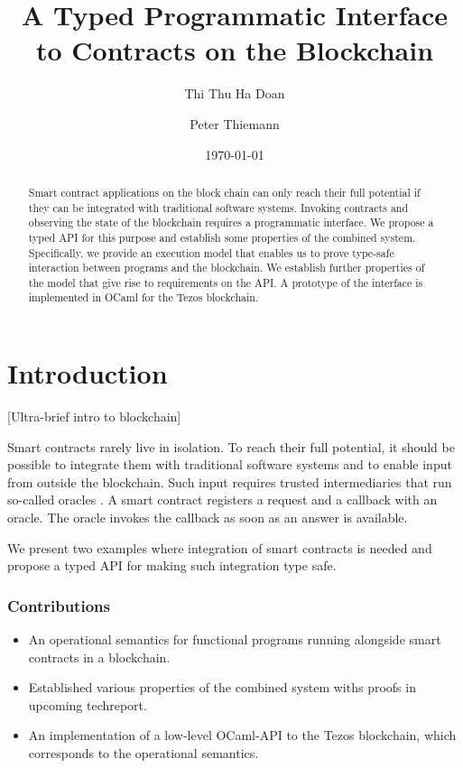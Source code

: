 \documentclass[a4paper]{llncs}
\title{A Typed Programmatic Interface to Contracts on the Blockchain}
\author{Thi Thu Ha Doan\and
Peter Thiemann\orcidID{0000-0002-9000-1239}}
\institute{University of Freiburg, Germany\\
\email{\{doanha,thiemann\}@informatik.uni-freiburg.de}
}
\date{\today}
\begin{document}
\maketitle
\pagestyle{plain}
\begin{abstract}
  Smart contract applications on the block chain can only reach their full potential if
  they can be integrated with traditional software systems. Invoking
  contracts and observing the state of the blockchain requires a
  programmatic interface. We propose a typed API for this
  purpose and establish some properties of the combined
  system. Specifically, we provide an execution model that
  enables us to prove type-safe interaction between programs and the 
  blockchain. We establish further properties of the model that
  give rise to requirements on the API. A prototype of the interface
  is implemented in OCaml for the Tezos blockchain.
\end{abstract}

\section{Introduction}
\label{sec:introduction}


{[Ultra-brief intro to blockchain]}

Smart contracts rarely live in isolation. To reach their full
potential, it should be possible to integrate them with traditional
software systems and to enable input from outside the blockchain. Such
input requires trusted intermediaries that run so-called oracles \cite{oracle-patterns,call-action-oracle}. A
smart contract registers a request and a callback with an oracle. The
oracle invokes the callback as soon as an answer is available. 

We present two examples where integration of smart contracts is needed
and propose a typed API for making such integration type safe.

\subsubsection{Contributions}
\label{sec:contributions}

\begin{itemize}
\item An operational semantics for functional programs running
  alongside smart contracts in a blockchain. 
\item Established various properties of the combined system withs
  proofs in upcoming techreport.
\item An implementation of a low-level OCaml-API to the Tezos
  blockchain, which corresponds to the operational semantics.
\end{itemize}
\end{document}
